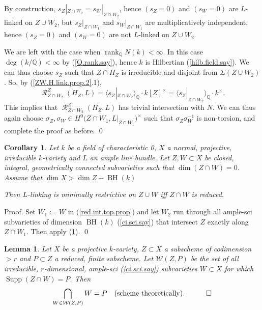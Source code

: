 \documentclass{amsart}
\newtheorem{lem}[thm]{Lemma}
\newtheorem{cor}[thm]{Corollary}
\theoremstyle{definition}
\theoremstyle{remark}
\newcommand{\q}[0]{{\mathbb Q}}
\newcommand{\qtq}[1]{\quad\mbox{#1}\quad}
\newcommand{\qrank}[0]{\operatorname{rank}_{\q}}
\newcommand{\supp}[0]{\operatorname{Supp}}
\newcommand{\res}[0]{\operatorname{\mathcal R}}
\newcommand{\BH}[0]{\operatorname{BH}}
\begin{document}
By construction, $s_Z|_{Z\cap W_2}=s_W|_{Z\cap W_2}$, hence  
$(s_Z=0)$ and $(s_W=0)$ are $L$-linked on  $Z\cup W_2$,
but $s_Z|_{Z\cap W_1}$ and $s_W|_{Z\cap W_1}$ are multiplicatively independent, hence  
$(s_Z=0)$ and $(s_W=0)$ are not $L$-linked on  $Z\cup W_2$. 

We are left with the case when $\qrank N(k)<\infty$. In this case
$\deg (k/\q)<\infty$ by (\ref{Q.rank.say}), hence $k$ is Hilbertian (\ref{hilb.field.say}). We can thus choose  $s_Z$ such that  
 $Z\cap H_Z$ is irreducible and disjoint from
$\Sigma(Z\cup W_2)$.  So, by (\ref{ZW.H.link.prop.2}.1), 
$$
\res^{Z}_{Z\cap W_2}(H_Z, L)= \bigl\langle s_Z|_{Z\cap W_2}\bigr\rangle_{\q} \cdot k[Z]^\times=\bigl\langle s_Z|_{Z\cap W_2}\bigr\rangle_{\q} \cdot k^\times.
$$
This implies that $\res^{Z}_{Z\cap W_2}(H_Z, L)$ has trivial intersection with $N$.
We can thus again choose $\sigma_Z, \sigma_W \in H^0\bigl(Z\cap W_1, L|_{Z\cap W_1}\bigr)^\times$
such that $\sigma_Z\sigma_W^{-1}$ is non-torsion, and complete the proof as before. 
\qed


\medskip




\begin{cor}\label{red.int.top.prop.cor}
 Let $k$ be a field of characteristic 0,
 $X$  a  normal, projective, irreducible  $k$-variety and $L$ an ample line bundle. Let
$Z, W\subset X$ be closed, integral, geometrically connected  subvarieties
such that  $\dim (Z\cap W)=0$.
Assume that $\dim X>\dim Z+ \BH(k)$ 

Then  $L$-linking is minimally restrictive on  $Z\cup W$ iff $Z\cap W$ is reduced. 
\end{cor}

Proof. Set $W_1:=W$ in (\ref{red.int.top.prop}) and let $W_2$ run through all 
ample-sci subvarieties of dimension $\BH(k)$  (\ref{ci.sci.say}) that intersect $Z$ exactly along $Z\cap W_1$. 
Then apply   (\ref{red.int.top.prop.lem.1}). \qed




\begin{lem}\label{red.int.top.prop.lem.1}
 Let $X$ be a projective $k$-variety, $Z\subset X$  a subscheme of codimension $>r$ and $P\subset Z$ a reduced, finite subscheme. 
Let  ${\mathcal W}(Z,P)$ be the set of all irreducible, $r$-dimensional, ample-sci (\ref{ci.sci.say}) subvarieties  $W\subset X$ for which
$\supp(Z\cap W)=P$. 
Then 
$$
\bigcap_{W\in {\mathcal W}(Z,P)}  W=P  \qtq{(scheme theoretically).} \qed
$$
\end{lem}
\end{document}

